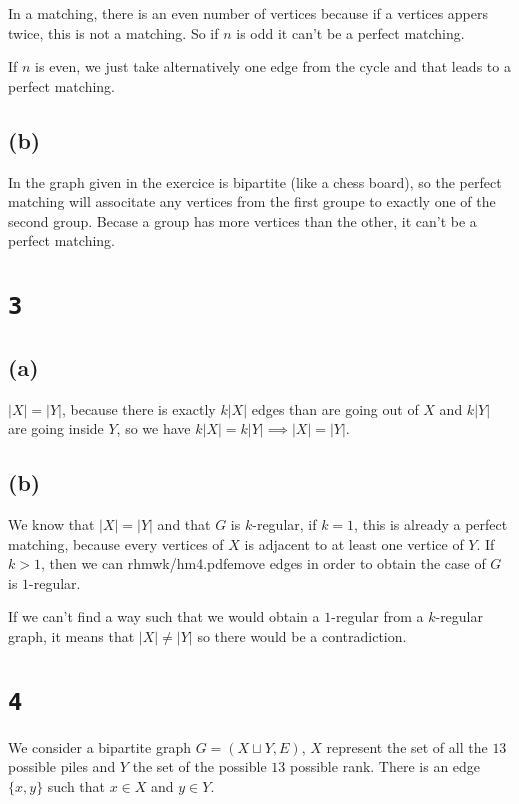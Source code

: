 \documentclass[a4paper,11pt]{report}
\begin{document}
In a matching, there is an even number of vertices because if a vertices appers
twice, this is not a matching. So if $n$ is odd it can't be a perfect matching.

If $n$ is even, we just take alternatively one edge from the cycle and that
leads to a perfect matching.


\subsection*{(b)}

In the graph given in the exercice is bipartite (like a chess board), so the
perfect matching will associtate any vertices from the first groupe to exactly
one of the second group. Becase a group has more vertices than the other, it
can't be a perfect matching.

\section*{\texttt{3}}

\subsection*{(a)}

$|X| = |Y|$, because there is exactly $k|X|$ edges than are going out of $X$ and
$k|Y|$ are going inside $Y$, so we have $k|X| = k|Y| \implies |X| = |Y|$.

\subsection*{(b)}

We know that $|X| = |Y|$ and that $G$ is $k$-regular, if $k=1$, this is already
a perfect matching, because every vertices of $X$ is adjacent to at least one
vertice of $Y$. If $k > 1$, then we can rhmwk/hm4.pdfemove edges in order to obtain the case
of $G$ is $1$-regular.

If we can't find a way such that we would obtain a $1$-regular from a
$k$-regular graph, it means that $|X| \neq |Y|$ so there would be a contradiction.

\section*{\texttt{4}}

We consider a bipartite graph $G=(X \sqcup Y,E)$, $X$ represent the set of all
the $13$ possible piles and $Y$ the set of the possible $13$ possible rank.
There is an edge $\{x,y\}$ such that $x \in X$ and $ y \in Y$.
\end{document}

